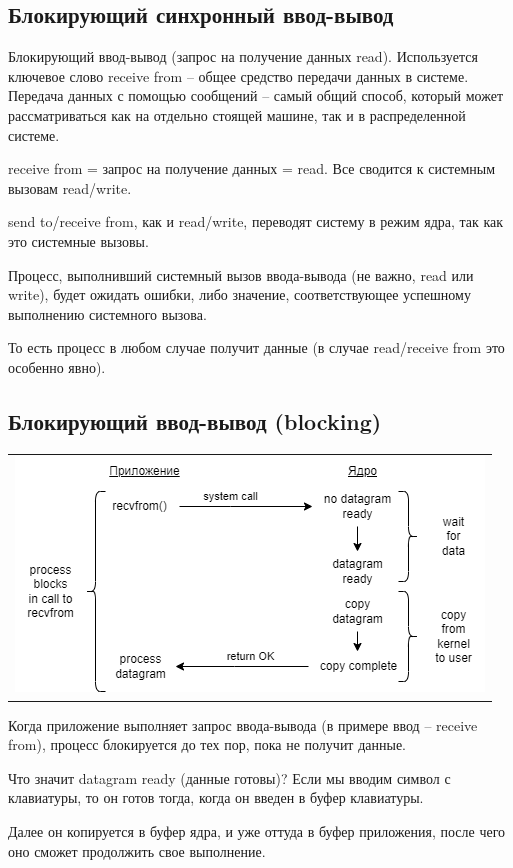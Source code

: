 \subsection{Блокирующий синхронный ввод-вывод}
Блокирующий ввод-вывод (запрос на получение данных read). Используется ключевое слово receive from – общее средство передачи данных в системе.
Передача данных с помощью сообщений – самый общий способ, который может рассматриваться как на отдельно стоящей машине, так и в распределенной системе. 

receive from = запрос на получение данных = read. Все сводится к системным вызовам read/write.

send to/receive from, как и read/write, переводят систему в режим ядра, так как это системные вызовы.

Процесс, выполнивший системный вызов ввода-вывода (не важно, read или write), будет ожидать ошибки, либо значение, соответствующее успешному выполнению системного вызова.

То есть процесс в любом случае получит данные (в случае read/receive from это особенно явно).
\subsection{Блокирующий ввод-вывод (blocking)}
\begin{table}[H]
  \centering
  \begin{tabular}{p{1\linewidth}}
    \centering
    \includegraphics[width=0.8\linewidth]{./images/1-1.png}
  \end{tabular}
\end{table}
Когда приложение выполняет запрос ввода-вывода (в примере ввод – receive from), процесс блокируется до тех пор, пока не получит данные.

Что значит datagram ready (данные готовы)? Если мы вводим символ с клавиатуры, то он готов тогда, когда он введен в буфер клавиатуры.

Далее он копируется в буфер ядра, и уже оттуда в буфер приложения, после чего оно сможет продолжить свое выполнение.


